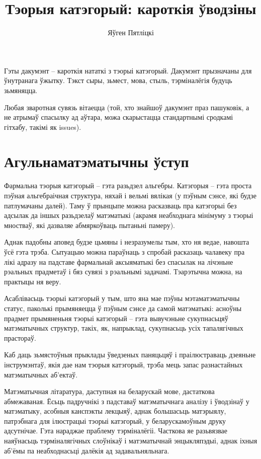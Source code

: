\documentclass[a4paper,12pt]{book}
\title{Тэорыя катэгорый: кароткія ўводзіны}
\author{Яўген Пятліцкі}
\begin{document}
\maketitle

Гэты дакумэнт -- кароткія нататкі з тэорыі катэгорый. Дакумэнт
прызначаны для ўнутранага ўжытку. Тэкст сыры, зьмест, мова, стыль,
тэрміналёгія будуць зьмяняцца.

Любая зваротная сувязь вітаецца (той, хто знайшоў дакумэнт праз
пашуковік, а не атрымаў спасылку ад аўтара, можа скарыстацца
стандартнымі сродкамі гітхабу, такімі як issues).

\tableofcontents

\setcounter{chapter}{-1}

\chapter{Агульнаматэматычны ўступ}

Фармальна тэорыя катэгорый -- гэта разьдзел альгебры. Катэгорыя --
гэта проста пэўная альгебраічная структура, няхай і вельмі вялікая (у
пэўным сэнсе, які будзе патлумачаны далей). Таму ў прынцыпе можна
расказваць пра катэгорыі без адсылак да іншых разьдзелаў матэматыкі
(акрамя неабходнага мінімуму з тэорыі мностваў, які дазваляе
абмяркоўваць пытаньні памеру).

Аднак падобны аповед будзе цьмяны і незразумелы тым, хто ня ведае,
навошта ўсё гэта трэба. Сытуацыю можна параўнаць з спробай расказаць
чалавеку пра лікі адразу на падставе фармальнай аксыяматыкі без
спасылак на лічэньне рэальных прадметаў і бяз сувязі з рэальнымі
задачамі. Тэарэтычна можна, на практыцы ня веру.

Асаблівасьць тэорыі катэгорый у тым, што яна мае пэўны мэтаматэматычны
статус, паколькі прымяняецца ў пэўным сэнсе да самой матэматыкі:
асноўны прадмет прымяненьня тэорыі катэгорый -- гэта вывучэньне
сукупнасьцяў матэматычных структур, такіх, як, напрыклад, сукупнасьць
усіх тапалягічных прастораў.

Каб даць зьмястоўныя прыклады ўведзеных паняцьцяў і праілюстраваць
дзеяньне інструмэнтаў, якія дае нам тэорыя катэгорый, трэба мець запас
разнастайных матэматычных аб'ектаў.

Матэматычная літаратура, даступная на беларускай мове, дастаткова
абмежаваная. Ёсьць падручнікі з падставаў матэматычнага аналізу і
ўводзінаў у матэматыку, асобныя канспэкты лекцыяў, аднак большасьць
матэрыялу, патрэбнага для ілюстрацыі тэорыі катэгорый, у
беларускамоўным друку адсутнічае. Гэта нараджае праблему
тэрміналёгіі. Часткова яе разьвязвае наяўнасьць тэрміналягічных
слоўнікаў і матэматычнай энцыкляпэдыі, аднак іхныя аб'ёмы па
неабходнасьці далёкія ад задавальняльнага.
\end{document}
